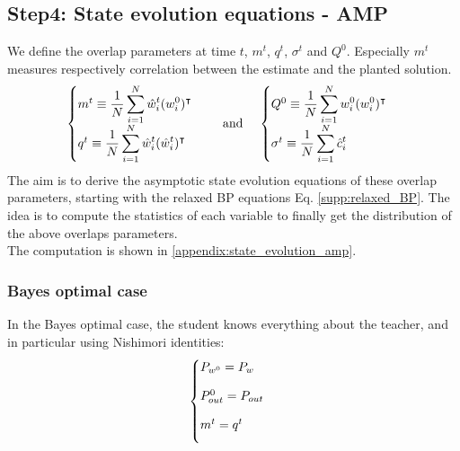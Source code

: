 \documentclass[aip,jmp,amsmath,amssymb,reprint]{revtex4}
\begin{document}
\newpage
\subsection{Step4: State evolution equations - AMP}
We define the overlap parameters at time $t$, $m^t$, $q^t$, $\sigma^t$ and $Q^0$. Especially $m^t$ measures respectively correlation between the estimate and the planted solution.
\begin{align}
	\begin{cases}
	m^t \equiv \displaystyle \frac{1}{N} \sum_{i=1}^N \hat{w}^t_i(w^0_i)^\intercal \\
	q^t \equiv \displaystyle \frac{1}{N} \sum_{i=1}^N \hat{w}^t_i(\hat{w}^{t}_i)^\intercal  
	\end{cases}
	\hspace{0.3cm} \textrm{ and } \hspace{0.3cm}
	\begin{cases}
	Q^0 \equiv \displaystyle \frac{1}{N} \sum_{i=1}^N w^0_i(w^0_i)^\intercal \\ 
	\sigma^t \equiv \displaystyle \frac{1}{N} \sum_{i=1}^N \hat{c}_{i}^{t} \\
	\end{cases}
	\label{amp_overlaps}
\end{align}
The aim is to derive the asymptotic state evolution equations of these overlap parameters, starting with the relaxed BP equations Eq. \ref{supp:relaxed_BP}. The idea is to compute the statistics of each variable to finally get the distribution of the above overlaps parameters.\\

The computation is shown in \ref{appendix:state_evolution_amp}.

\subsubsection*{Bayes optimal case}
In the Bayes optimal case, the student knows everything about the teacher, and in particular using Nishimori identities:
\begin{align*}
	\begin{cases}
		P_{w^0} = P_w \spacecase
		P^0_{out} = P_{out} \spacecase
		m^t = q^t \spacecase
	\end{cases}
\end{align*}
\end{document}
